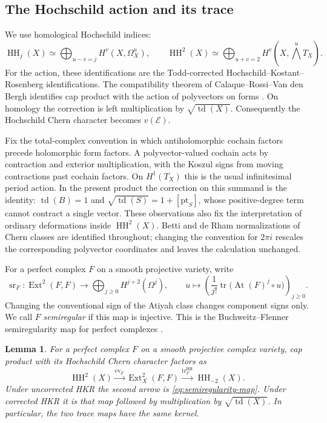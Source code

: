 \documentclass[11pt]{article}
\numberwithin{equation}{section}
\newtheorem{lemma}[theorem]{Lemma}
\theoremstyle{definition}
\theoremstyle{remark}
\newcommand{\HH}{\operatorname{HH}}
\newcommand{\Ext}{\operatorname{Ext}}
\newcommand{\td}{\operatorname{td}}
\begin{document}
\subsection{The Hochschild action and its trace}

We use homological Hochschild indices:
\[
 \HH_j(X)\simeq\bigoplus_{u-v=j}H^v(X,\Omega_X^u),\qquad
 \HH^2(X)\simeq\bigoplus_{u+v=2}H^v(X,\textstyle\bigwedge^u T_X).
\]
For the action, these identifications are the Todd-corrected
Hochschild--Kostant--Rosenberg identifications. The compatibility
theorem of Calaque--Rossi--Van den Bergh identifies cap product with
the action of polyvectors on forms
\cite[Theorem~1.4]{Deformation:CRV}. On homology the correction is
left multiplication by $\sqrt{\td(X)}$. Consequently the Hochschild
Chern character becomes $v(\mathcal E)$.

Fix the total-complex convention in which antiholomorphic cochain
factors precede holomorphic form factors. A polyvector-valued
cochain acts by contraction and exterior multiplication, with the
Koszul signs from moving contractions past cochain factors. On
$H^1(T_X)$ this is the usual infinitesimal period action. In the
present product the correction on this summand is the identity:
$\td(B)=1$ and
$\sqrt{\td(S)}=1+[\mathrm{pt}_S]$, whose positive-degree term cannot
contract a single vector. These observations also fix the interpretation
of ordinary deformations inside $\HH^2(X)$. Betti and de Rham
normalizations of Chern classes are identified throughout; changing
the convention for $2\pi i$ rescales the corresponding polyvector
coordinates and leaves the calculation unchanged.

For a perfect complex $F$ on a smooth projective variety, write
\begin{equation}\label{eq:semiregularity-map}
 \operatorname{sr}_F:\Ext^2(F,F)\longrightarrow
       \bigoplus_{j\ge0}H^{j+2}(\Omega^j),\qquad
 u\longmapsto
 \left(\frac{1}{j!}\operatorname{tr}
       \bigl(\operatorname{At}(F)^j\circ u\bigr)\right)_{j\ge0}.
\end{equation}
Changing the conventional sign of the Atiyah class changes component
signs only. We call $F$ \emph{semiregular} if this map is injective.
This is the Buchweitz--Flenner semiregularity map for perfect complexes
\cite{Deformation:BF2003}.

\begin{lemma}\label{lem:cap-trace}
For a perfect complex $F$ on a smooth projective complex variety, cap
product with its Hochschild Chern character factors as
\[
 \HH^2(X)\xrightarrow{\operatorname{ev}_F}\Ext^2_X(F,F)
      \xrightarrow{\operatorname{tr}^{\HH}_F}\HH_{-2}(X).
\]
Under uncorrected HKR the second arrow is
\eqref{eq:semiregularity-map}. Under corrected HKR it is that map
followed by multiplication by $\sqrt{\td(X)}$. In particular, the
two trace maps have the same kernel.
\end{lemma}
\end{document}
